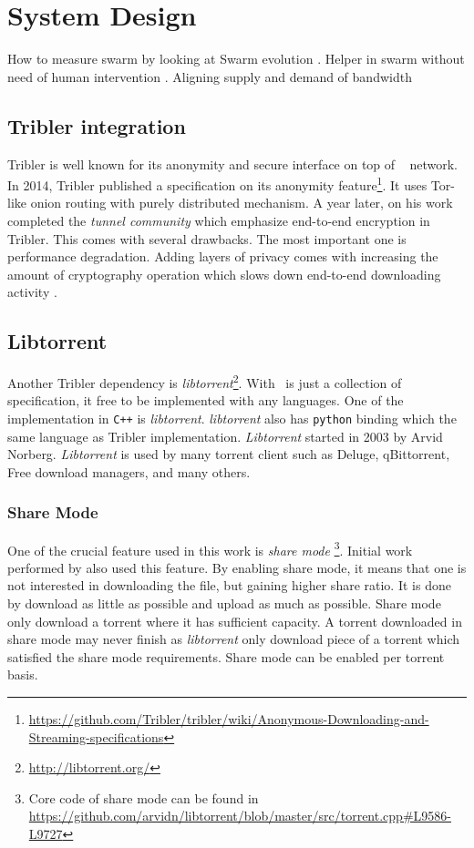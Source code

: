 \chapter{System Design}
\label{chp:design}

How to measure swarm by looking at Swarm evolution \cite{2013:swarmevolution:su}.
Helper in swarm without need of human intervention \cite{2014:bwmarket:capota}. Aligning supply and demand of bandwidth

\section{Tribler integration}
Tribler is well known for its anonymity and secure interface on top of \bt~ network. In 2014, Tribler published a specification on its anonymity feature\footnote{\url{https://github.com/Tribler/tribler/wiki/Anonymous-Downloading-and-Streaming-specifications}}. It uses Tor-like onion routing with purely distributed mechanism. A year later, \citeauthor{2015:tunnel:ruigrok} on his work completed the \textit{tunnel community} which emphasize end-to-end encryption in Tribler. This comes with several drawbacks. The most important one is performance degradation. Adding layers of privacy comes with increasing the amount of cryptography operation which slows down end-to-end downloading activity \cite{2015:tunnel:ruigrok}.

\section{Libtorrent}
Another Tribler dependency is \textit{libtorrent}\footnote{\url{http://libtorrent.org/}}. With \bt~is just a collection of specification, it free to be implemented with any languages. One of the implementation in \texttt{C++} is \textit{libtorrent}. \textit{libtorrent} also has \texttt{python} binding which the same language as Tribler implementation. \textit{Libtorrent} started in 2003 by Arvid Norberg. \textit{Libtorrent} is used by many torrent client such as Deluge, qBittorrent, Free download managers, and many others.

\subsection{Share Mode}
One of the crucial feature used in this work is \textit{share mode} \footnote{Core code of share mode can be found in \url{https://github.com/arvidn/libtorrent/blob/master/src/torrent.cpp\#L9586-L9727}}. Initial work performed by \citeauthor{2015:creditmining:capota} also used this feature\cite{2015:creditmining:capota}. By enabling share mode, it means that one is not interested in downloading the file, but gaining higher share ratio. It is done by download as little as possible and upload as much as possible. Share mode only download a torrent where it has sufficient capacity. A torrent downloaded in share mode may never finish as \textit{libtorrent} only download piece of a torrent which satisfied the share mode requirements. Share mode can be enabled per torrent basis.


